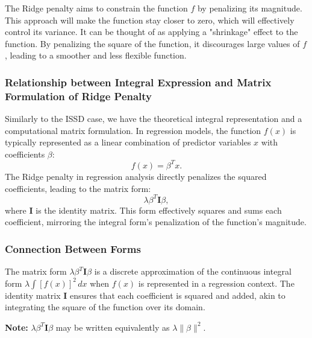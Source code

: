 \documentclass[12pt, twoside,hidelinks]{article}
\theoremstyle{definition}
\numberwithin{equation}{section}
\begin{document}
The Ridge penalty aims to constrain the function \( f \) by penalizing its magnitude. This approach will make the function stay closer to zero, which will effectively control its variance. It can be thought of as applying a "shrinkage" effect to the function. By penalizing the square of the function, it discourages large values of \( f \), leading to a smoother and less flexible function.

\subsubsection{Relationship between Integral Expression and Matrix Formulation of Ridge Penalty}\label{sec:smooth:ridge:relation}

Similarly to the ISSD case, we have the theoretical integral representation and a computational matrix formulation.
\newline
In regression models, the function \( f(x) \) is typically represented as a linear combination of predictor variables \( x \) with coefficients \( \beta \):
\begin{equation}
    f(x) = \beta^T x.
\end{equation}
\newline
The Ridge penalty in regression analysis directly penalizes the squared coefficients, leading to the matrix form:
\begin{equation}
    \lambda \beta^T \mathbf{I} \beta,
\end{equation}
where \( \mathbf{I} \) is the identity matrix. This form effectively squares and sums each coefficient, mirroring the integral form's penalization of the function's magnitude.

\subsubsection*{Connection Between Forms}
The matrix form \( \lambda \beta^T \mathbf{I} \beta \) is a discrete approximation of the continuous integral form \( \lambda \int [f(x)]^2 \, dx \) when \( f(x) \) is represented in a regression context. The identity matrix \( \mathbf{I} \) ensures that each coefficient is squared and added, akin to integrating the square of the function over its domain.

\textbf{Note:} \( \lambda \beta^T \mathbf{I} \beta \) may be written equivalently as \( \lambda \|\beta\|^2 \).
\newline
\end{document}
